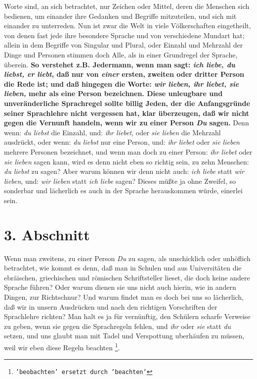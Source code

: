  Worte sind, an sich betrachtet, nur Zeichen oder
Mittel, deren die Menschen sich
bedienen, um einander ihre Gedanken und Begriffe mitzuteilen, und sich mit
einander zu unterreden. Nun ist zwar die Welt in viele Völkerschaften
eingetheilt, von denen fast jede ihre besondere Sprache und von verschiedene
Mundart hat; allein in dem Begriffe von Singular und Plural, oder
Einzahl und Mehrzahl der Dinge und Personen stimmen doch Alle, als in
einer Grundregel der Sprache, überein. \textbf{So verstehet z.B. Jedermann, wenn
man
sagt: \textit{ich liebe, du liebst, er liebt}, daß nur von \textit{einer}
ersten, zweiten
oder dritter Person die Rede ist; und daß hingegen die Worte: \textit{wir
lieben, ihr
liebet, sie lieben,} mehr als eine Person bezeichnen. Diese unleugbare und
unveränderliche Sprachregel sollte billig Jeden, der die Anfangsgründe seiner
Sprachlehre nicht vergessen hat, klar überzeugen, daß wir nicht gegen die
Vernunft handeln, wenn wir zu einer Person \textit{Du} sagen.} Denn wenn:
\textit{du
liebst} die Einzahl, und: \textit{ihr liebet}, oder \textit{sie lieben} die
Mehrzahl
ausdrückt, oder wenn: \textit{du liebst} nur eine Person, und: \textit{ihr
liebet} oder
\textit{sie lieben} mehrere Personen bezeichnet, und wenn man doch zu einer
Person:
\textit{ihr liebet} oder \textit{sie lieben} sagen kann, wird es denn nicht eben
so
richtig sein, zu zehn Menschen: \textit{du liebst} zu sagen? Aber warum können
wir
denn nicht auch: \textit{ich liebe} statt \textit{wir lieben}, und: \textit{wir
lieben} statt
\textit{ich liebe} sagen? Dieses müßte ja ohne Zweifel, so sonderbar und
lächerlich
es auch in der Sprache herauskommen würde, einerlei sein.

\section{3. Abschnitt} \label{kap10_ab3}

Wenn man zweitens, zu einer Person \textit{Du} zu sagen, als unschicklich oder
unhöflich betrachtet, wie kommt es denn, daß man in Schulen und aus
Universitäten die ebräischen, griechischen und römischen Schriftsteller lieset,
die doch keine andere Sprache führen? Oder warum dienen sie uns nicht auch
hierin, wie in andern Dingen, zur Richtschnur? Und warum findet man es doch bei
uns so lächerlich, daß wir in unsern Ausdrücken und nach den richtigen
Vorschriften der Sprachlehre richten? Man halt es ja für vernünftig, den
Schülern scharfe Verweise zu geben, wenn sie gegen die Sprachregeln fehlen, und
\textit{ihr} oder \textit{sie} statt \textit{du} setzen, und uns glaubt man mit
Tadel und Verspottung
uberhäufen zu müssen, weil wir eben diese Regeln beachten
\footnote{\texttt{'beobachten' ersetzt durch 'beachten'}}.

